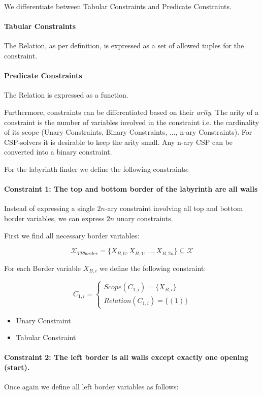 \documentclass[11pt,a4paper]{article}
\begin{document}
We differentiate between Tabular Constraints and Predicate Constraints. 
\paragraph{Tabular Constraints}
The Relation, as per definition, is expressed as a set of allowed tuples for the constraint.
\paragraph{Predicate Constraints}
The Relation is expressed as a function. 

Furthermore, constraints can be differentiated based on their \emph{arity}. The arity of a constraint is the number of variables involved in the constraint i.e. the cardinality of its scope (Unary Constraints, Binary Constraints, ..., n-ary Constraints). For CSP-solvers it is desirable to keep the arity small. Any n-ary CSP can be converted into a binary constraint. 

For the labyrinth finder we define the following constraints:

\paragraph{Constraint 1: The top and bottom border of the labyrinth are all walls}
Instead of expressing a single $2n$-ary constraint involving all top and bottom border variables, we can express $2n$ unary constraints. 

First we find all necessary border variables:

\[
\mathcal{X}_{TBborder} = \{X_{B,0}, X_{B,1}, \dots, X_{B,2n}\} \subseteq \mathcal{X}
\]

For each Border variable $X_{B,i}$ we define the following constraint: 

\[
C_{1, i} =
\begin{cases}
Scope(C_{1, i}) = \{X_{B,i}\}  \\
Relation(C_{1, i}) = \{(1)\}
\end{cases}
\]

\begin{itemize}
\item Unary Constraint
\item Tabular Constraint
\end{itemize}

\paragraph{Constraint 2: The left border is all walls except exactly one opening (start).}
Once again we define all left border variables as follows: 
\end{document}
